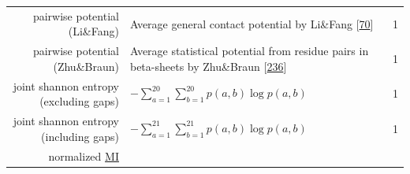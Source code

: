 \documentclass[11pt,a4paper,twoside]{book}
\theoremstyle{definition}
\theoremstyle{definition}
\theoremstyle{remark}
\begin{document}
\begin{longtable}[]{@{}rlc@{}}
\begin{minipage}[t]{0.23\columnwidth}\raggedleft\strut
pairwise potential (Li\&Fang)\strut
\end{minipage} & \begin{minipage}[t]{0.50\columnwidth}\raggedright\strut
Average general contact potential by Li\&Fang
{[}\protect\hyperlink{ref-Li2011}{70}{]}\strut
\end{minipage} & \begin{minipage}[t]{0.18\columnwidth}\centering\strut
1\strut
\end{minipage}\tabularnewline
\begin{minipage}[t]{0.23\columnwidth}\raggedleft\strut
pairwise potential (Zhu\&Braun)\strut
\end{minipage} & \begin{minipage}[t]{0.50\columnwidth}\raggedright\strut
Average statistical potential from residue pairs in beta-sheets by
Zhu\&Braun {[}\protect\hyperlink{ref-Zhu1999}{236}{]}\strut
\end{minipage} & \begin{minipage}[t]{0.18\columnwidth}\centering\strut
1\strut
\end{minipage}\tabularnewline
\begin{minipage}[t]{0.23\columnwidth}\raggedleft\strut
joint shannon entropy (excluding gaps)\strut
\end{minipage} & \begin{minipage}[t]{0.50\columnwidth}\raggedright\strut
\(- \sum_{a=1}^{20}\sum_{b=1}^{20} p(a,b) \log p(a,b)\)\strut
\end{minipage} & \begin{minipage}[t]{0.18\columnwidth}\centering\strut
1\strut
\end{minipage}\tabularnewline
\begin{minipage}[t]{0.23\columnwidth}\raggedleft\strut
joint shannon entropy (including gaps)\strut
\end{minipage} & \begin{minipage}[t]{0.50\columnwidth}\raggedright\strut
\(- \sum_{a=1}^{21}\sum_{b=1}^{21} p(a,b) \log p(a,b)\)\strut
\end{minipage} & \begin{minipage}[t]{0.18\columnwidth}\centering\strut
1\strut
\end{minipage}\tabularnewline
\begin{minipage}[t]{0.23\columnwidth}\raggedleft\strut
normalized \protect\hyperlink{abbrev}{MI}\strut
\end{minipage} & \begin{minipage}[t]{0.50\columnwidth}\raggedright\strut

\end{minipage}
\end{longtable}
\end{document}
